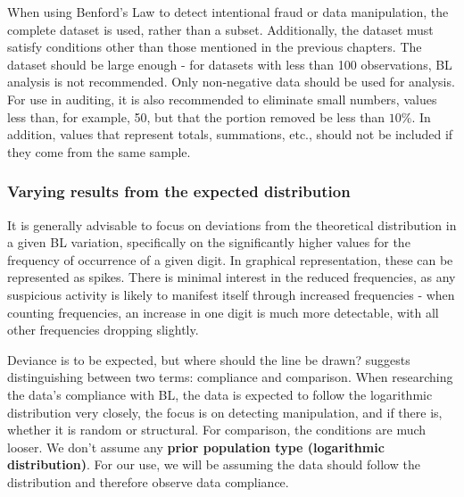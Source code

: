 When using Benford's Law to detect intentional fraud or data manipulation, the complete dataset is used, rather than a subset. Additionally, the dataset must satisfy conditions other than those mentioned in the previous chapters. The dataset should be large enough - for datasets with less than 100 observations, BL analysis is not recommended. %
Only non-negative data should be used for analysis. For use in auditing, it is also recommended to eliminate small numbers, values less than, for example, 50, but that the portion removed be less than $10\%$. In addition, values that represent totals, summations, etc., should not be included if they come from the same sample. \cite{kossovsky2014benford} %

\subsubsection*{Varying results from the expected distribution}

It is generally advisable to focus on deviations from the theoretical distribution in a given BL variation, specifically on the significantly higher values for the frequency of occurrence of a given digit. In graphical representation, these can be represented as spikes. There is minimal interest in the reduced frequencies, as any suspicious activity is likely to manifest itself through increased frequencies - when counting frequencies, an increase in one digit is much more detectable, with all other frequencies dropping slightly. \cite{kossovsky2014benford} %



Deviance is to be expected, but where should the line be drawn?  \citeauthor{kossovsky2014benford} suggests distinguishing between two terms: compliance and comparison. When researching the data's compliance with BL, the data is expected to follow the logarithmic distribution very closely, the focus is on detecting manipulation, and if there is, whether it is random or structural. For comparison, the conditions are much looser. We don't assume any \textbf{prior population type (logarithmic distribution)}. For our use, we will be assuming the data should follow the distribution and therefore observe data compliance.



